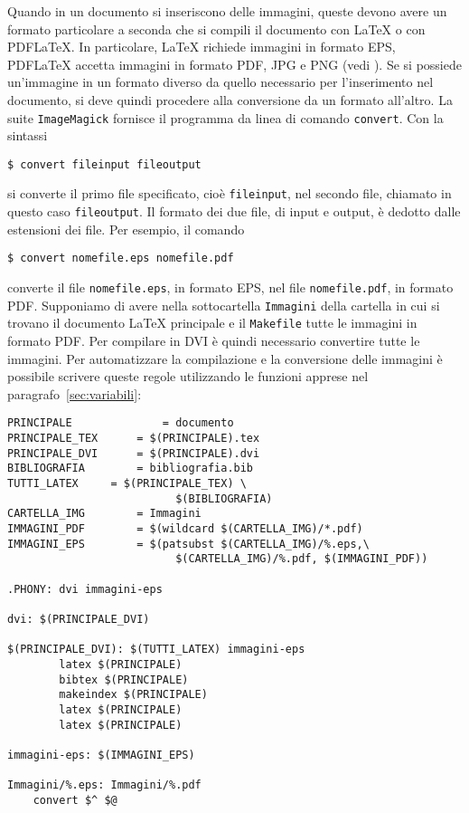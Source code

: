 Quando in un documento si inseriscono delle immagini, queste devono avere un
formato particolare a seconda che si compili il documento con \LaTeX{}
o con \textsc{PDF}\LaTeX.  In particolare, \LaTeX{}
richiede immagini in formato \textsc{EPS}, \textsc{PDF}\LaTeX{}
accetta immagini in formato \textsc{PDF}, \textsc{JPG} e \textsc{PNG} (vedi
\textcite[105]{pantieri:latex}).  Se si possiede un'immagine in un formato
diverso da quello necessario per l'inserimento nel documento, si deve quindi
procedere alla conversione da un formato all'altro.  La suite
\texttt{ImageMagick} fornisce il programma da linea di comando
\texttt{convert}. Con la sintassi
\begin{verbatim}
$ convert fileinput fileoutput
\end{verbatim} %
si converte il primo file specificato, cioè \texttt{fileinput}, nel secondo
file, chiamato in questo caso \texttt{fileoutput}.  Il formato dei due file, di
input e output, è dedotto dalle estensioni dei file.  Per esempio, il comando
\begin{verbatim}
$ convert nomefile.eps nomefile.pdf
\end{verbatim} %
converte il file \texttt{nomefile.eps}, in formato \textsc{EPS}, nel file
\texttt{nomefile.pdf}, in formato \textsc{PDF}.  Supponiamo di avere nella
sottocartella \texttt{Immagini} della cartella in cui si trovano il documento
\LaTeX{}
principale e il \texttt{Makefile} tutte le immagini in formato \textsc{PDF}.
Per compilare in \textsc{DVI} è quindi necessario convertire tutte le immagini.
Per automatizzare la compilazione e la conversione delle immagini è possibile
scrivere queste regole utilizzando le funzioni apprese nel
paragrafo~\ref{sec:variabili}:
\begin{lstlisting}[caption={\texttt{Makefile} in cui le immagini \textsc{PDF}
vengono convertite in \textsc{EPS} nella compilazione con \LaTeX.},label=lst:pdf-eps]
PRINCIPALE              = documento
PRINCIPALE_TEX		= $(PRINCIPALE).tex
PRINCIPALE_DVI		= $(PRINCIPALE).dvi
BIBLIOGRAFIA		= bibliografia.bib
TUTTI_LATEX		= $(PRINCIPALE_TEX) \
                          $(BIBLIOGRAFIA)
CARTELLA_IMG		= Immagini
IMMAGINI_PDF		= $(wildcard $(CARTELLA_IMG)/*.pdf)
IMMAGINI_EPS		= $(patsubst $(CARTELLA_IMG)/%.eps,\
                          $(CARTELLA_IMG)/%.pdf, $(IMMAGINI_PDF))

.PHONY: dvi immagini-eps

dvi: $(PRINCIPALE_DVI)

$(PRINCIPALE_DVI): $(TUTTI_LATEX) immagini-eps
        latex $(PRINCIPALE)
        bibtex $(PRINCIPALE)
        makeindex $(PRINCIPALE)
        latex $(PRINCIPALE)
        latex $(PRINCIPALE)

immagini-eps: $(IMMAGINI_EPS)

Immagini/%.eps: Immagini/%.pdf
	convert $^ $@
\end{lstlisting} %
